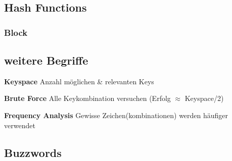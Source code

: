 \documentclass[
  10pt,
  a4paper,
]{article}
\begin{document}
\begin{multicols*}{2}
\subsection{Hash Functions}\label{hash-functions}

\subsubsection{Block}\label{block}

\subsection{weitere Begriffe}\label{weitere-begriffe}

{\small
\textbf{Keyspace} Anzahl möglichen \& relevanten Keys

\textbf{Brute Force} Alle Keykombination versuchen (Erfolg $\approx$ Keyspace/2)

\textbf{Frequency Analysis} Gewisse Zeichen(kombinationen) werden häufiger verwendet 

}

\subsection{Buzzwords}\label{buzzwords}


\end{multicols*}
\end{document}
